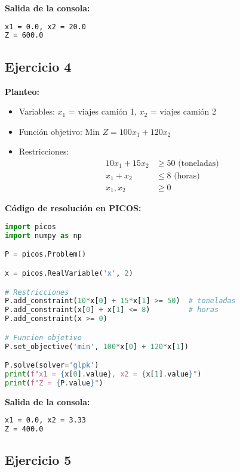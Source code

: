 \documentclass[12pt]{article}
\begin{document}
\textbf{Salida de la consola:}
\begin{lstlisting}[language=bash,backgroundcolor=\color{black},basicstyle=\color{white}\ttfamily,numbers=none]
x1 = 0.0, x2 = 20.0
Z = 600.0
\end{lstlisting}

\subsection{Ejercicio 4}

\textbf{Planteo:}
\begin{itemize}
\item Variables: $x_1$ = viajes camión 1, $x_2$ = viajes camión 2
\item Función objetivo: Min $Z = 100x_1 + 120x_2$
\item Restricciones:
  \begin{align*}
  10x_1 + 15x_2 &\geq 50 \text{ (toneladas)} \\
  x_1 + x_2 &\leq 8 \text{ (horas)} \\
  x_1, x_2 &\geq 0
  \end{align*}
\end{itemize}

\textbf{Código de resolución en PICOS:}
\begin{lstlisting}[language=Python]
import picos
import numpy as np

P = picos.Problem()

x = picos.RealVariable('x', 2)

# Restricciones
P.add_constraint(10*x[0] + 15*x[1] >= 50)  # toneladas
P.add_constraint(x[0] + x[1] <= 8)         # horas
P.add_constraint(x >= 0)

# Funcion objetivo
P.set_objective('min', 100*x[0] + 120*x[1])

P.solve(solver='glpk')
print(f"x1 = {x[0].value}, x2 = {x[1].value}")
print(f"Z = {P.value}")
\end{lstlisting}

\textbf{Salida de la consola:}
\begin{lstlisting}[language=bash,backgroundcolor=\color{black},basicstyle=\color{white}\ttfamily,numbers=none]
x1 = 0.0, x2 = 3.33
Z = 400.0
\end{lstlisting}

\subsection{Ejercicio 5}
\end{document}

